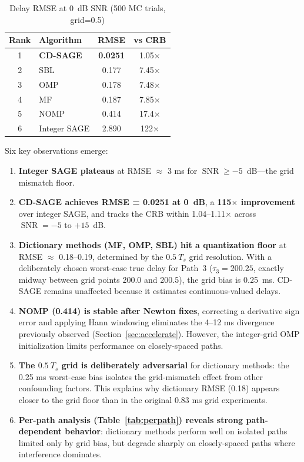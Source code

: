 \documentclass[a4paper,fleqn]{cas-dc}
\DeclareMathOperator{\SNR}{SNR}
\begin{document}
\begin{table}[cols=3,pos=htbp]
\centering
\caption{Delay RMSE at 0~dB SNR (500 MC trials, grid=0.5)}
\label{tab:ranking}
\small
\begin{tabular}{@{}clcc@{}}
\toprule
Rank & Algorithm & RMSE & vs CRB \\
\midrule
1 & \textbf{CD-SAGE} & \textbf{0.0251} & 1.05$\times$ \\
2 & SBL & 0.177 & 7.45$\times$ \\
3 & OMP & 0.178 & 7.48$\times$ \\
4 & MF & 0.187 & 7.85$\times$ \\
5 & NOMP & 0.414 & 17.4$\times$ \\
6 & Integer SAGE & 2.890 & 122$\times$ \\
\bottomrule
\end{tabular}
\end{table}

Six key observations emerge:

\begin{enumerate}
\item \textbf{Integer SAGE plateaus} at RMSE $\approx$ 3 ms for $\SNR \ge -5$~dB---the grid mismatch floor.
\item \textbf{CD-SAGE achieves RMSE = 0.0251 at 0~dB}, a \textbf{115$\times$ improvement} over integer SAGE, and tracks the CRB within 1.04--1.11$\times$ across $\SNR = -5$ to $+15$~dB.
\item \textbf{Dictionary methods (MF, OMP, SBL) hit a quantization floor} at RMSE $\approx$ 0.18--0.19, determined by the $0.5\ T_s$ grid resolution. With a deliberately chosen worst-case true delay for Path~3 ($\tau_3 = 200.25$, exactly midway between grid points 200.0 and 200.5), the grid bias is 0.25~ms. CD-SAGE remains unaffected because it estimates continuous-valued delays.
\item \textbf{NOMP (0.414) is stable after Newton fixes}, correcting a derivative sign error and applying Hann windowing eliminates the 4--12 ms divergence previously observed (Section~\ref{sec:accelerate}). However, the integer-grid OMP initialization limits performance on closely-spaced paths.
\item \textbf{The $0.5\ T_s$ grid is deliberately adversarial} for dictionary methods: the 0.25 ms worst-case bias isolates the grid-mismatch effect from other confounding factors. This explains why dictionary RMSE (0.18) appears closer to the grid floor than in the original 0.83 ms grid experiments.
\item \textbf{Per-path analysis (Table~\ref{tab:perpath}) reveals strong path-dependent behavior}: dictionary methods perform well on isolated paths limited only by grid bias, but degrade sharply on closely-spaced paths where interference dominates.
\end{enumerate}
\end{document}
